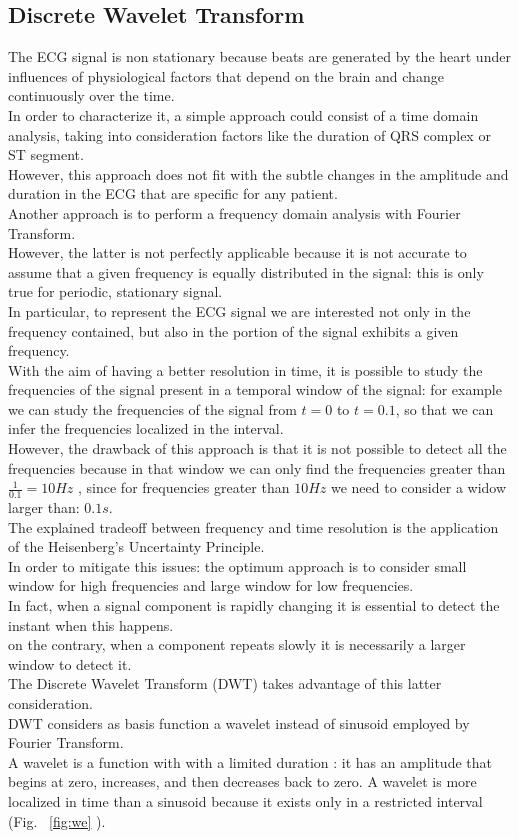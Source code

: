 \documentclass[LaM,binding=0.6cm]{sapthesis}
\begin{document}
\subsection{Discrete Wavelet Transform}
The ECG signal is non stationary because beats are generated by the heart under influences of physiological factors that depend on the brain and change continuously over the time.\\In order to characterize it, a simple approach could consist of a time domain analysis, taking into consideration factors like the duration of QRS complex or ST segment.\\However, this approach does not fit with the subtle changes in the amplitude and duration in the ECG that are specific for any patient.\\Another approach is to perform a frequency domain analysis with Fourier Transform.\\However, the latter is not perfectly applicable because it is not accurate to assume that a given frequency is equally distributed in the signal: this is only true for periodic, stationary signal.\\In particular, to represent the ECG signal we are interested not only in the frequency contained, but also in the portion of the signal exhibits a given frequency.\\With the aim of having a better resolution in time, it is possible to study the frequencies of the signal present in a temporal window of the signal: for example we can study the frequencies of the signal from $t=0$ to $t=0.1$, so that we can infer the frequencies localized in the interval.\\However, the drawback of this approach is that it is not possible to detect all the frequencies because in that window we can only find the frequencies greater than $\frac{1}{0.1}=10 Hz$ , since for frequencies greater than $10 Hz$ we need to consider a widow larger than: $0.1s$.\\The explained tradeoff between frequency and time resolution is the application of the Heisenberg's Uncertainty Principle.\\In order to mitigate this issues: the optimum approach is to consider small window for high frequencies and large window for low frequencies.\\In fact, when a signal component is rapidly changing it is essential to detect the instant when this happens.\\on the contrary, when a component repeats slowly it is necessarily a larger window to detect it.\\The Discrete Wavelet Transform (DWT) takes advantage of this latter consideration.\\DWT considers as basis function a wavelet instead of sinusoid employed by Fourier Transform.\\A wavelet is a function with with a limited duration : it has an amplitude that begins at zero, increases, and then decreases back to zero. A wavelet is more localized in time than a sinusoid because it exists only in a restricted interval (Fig. ~\ref{fig:we} ). 
\end{document}
